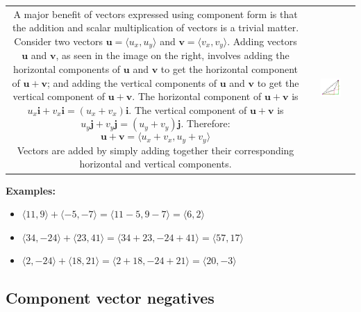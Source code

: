 \documentclass{article}
\begin{document}
\begin{tabular}{cc}
\parbox{0.5\textwidth}{
A major benefit of vectors expressed using component form is that the addition and scalar multiplication of vectors is a trivial matter. Consider two vectors \(\mathbf{u} = \langle u_x, u_y \rangle\) and \(\mathbf{v} = \langle v_x, v_y \rangle\). Adding vectors \(\mathbf{u}\) and \(\mathbf{v}\), as seen in the image on the right, involves adding the horizontal components of \(\mathbf{u}\) and \(\mathbf{v}\) to get the horizontal component of \(\mathbf{u} + \mathbf{v}\); and adding the vertical components of \(\mathbf{u}\) and \(\mathbf{v}\) to get the vertical component of \(\mathbf{u} + \mathbf{v}\). The horizontal component of \(\mathbf{u} + \mathbf{v}\) is \(u_x\mathbf{i} + v_x\mathbf{i} = (u_x + v_x)\mathbf{i}\). The vertical component of \(\mathbf{u} + \mathbf{v}\) is \(u_y\mathbf{j} + v_y\mathbf{j} = (u_y + v_y)\mathbf{j}\). Therefore:
\[\mathbf{u} + \mathbf{v} = \langle u_x + v_x, u_y + v_y \rangle\]
Vectors are added by simply adding together their corresponding horizontal and vertical components.
} & \parbox{0.5\textwidth}{
\includegraphics[width = 0.5\textwidth]{component_vector_addition}
}
\end{tabular}

\textbf{Examples:}
\begin{itemize}
\item \(\langle 11, 9 \rangle + \langle -5, -7 \rangle = \langle 11 - 5, 9 - 7 \rangle = \langle 6, 2 \rangle\)
\item \(\langle 34, -24 \rangle + \langle 23, 41 \rangle = \langle 34 + 23, -24 + 41 \rangle = \langle 57, 17 \rangle\)
\item \(\langle 2, -24 \rangle + \langle 18, 21 \rangle = \langle 2 + 18, -24 + 21 \rangle = \langle 20, -3 \rangle\)
\end{itemize}


\subsection*{Component vector negatives}
\end{document}
